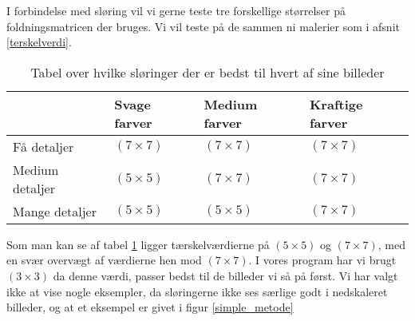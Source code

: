 I forbindelse med sløring vil vi gerne teste tre forskellige størrelser på foldningsmatricen der bruges. Vi vil teste
på de sammen ni malerier som i afsnit \ref{terskelverdi}.

\begin{table}[!h]
    \centering
    \begin{tabular}{| l | l | l | l |} \hline
                            & Svage farver	& Medium farver	& Kraftige farver 	\\ \hline
        Få detaljer 		& $(7 \times 7)$	& $(7 \times 7)$	& $(7 \times 7)$		\\ \hline
        Medium detaljer 	& $(5 \times 5)$	& $(7 \times 7)$	& $(7 \times 7)$		\\ \hline
        Mange detaljer		& $(5 \times 5)$	& $(5 \times 5)$	& $(7 \times 7)$		\\ \hline
    \end{tabular}
    \caption{Tabel over hvilke sløringer der er bedst til hvert af sine billeder}
    \label{sloringTabel}
\end{table}

Som man kan se af tabel \ref{sloringTabel} ligger tærskelværdierne på
$(5 \times 5)$ og $(7 \times 7)$, med en svær overvægt af værdierne hen
mod $(7 \times 7)$. I vores program har vi brugt $(3 \times 3)$ da denne
værdi, passer bedst til de billeder vi så på først. Vi har valgt ikke at
vise nogle eksempler, da sløringerne ikke ses særlige godt i nedskaleret
billeder, og at et eksempel er givet i figur \ref{simple_metode}
